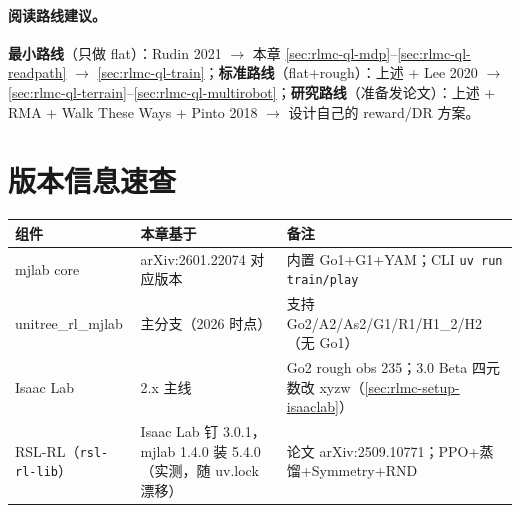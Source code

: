 \paragraph{阅读路线建议。}\textbf{最小路线}（只做 flat）：Rudin 2021 $\to$ 本章 \cref{sec:rlmc-ql-mdp}--\cref{sec:rlmc-ql-readpath} $\to$ \cref{sec:rlmc-ql-train}；\textbf{标准路线}（flat+rough）：上述 + Lee 2020 $\to$ \cref{sec:rlmc-ql-terrain}--\cref{sec:rlmc-ql-multirobot}；\textbf{研究路线}（准备发论文）：上述 + RMA + Walk These Ways + Pinto 2018 $\to$ 设计自己的 reward/DR 方案。

\section{版本信息速查}
\label{sec:rlmc-ql-versions}

\begin{center}
\small
\begin{tabular}{@{}lll@{}}
\toprule
组件 & 本章基于 & 备注 \\
\midrule
mjlab core & arXiv:2601.22074 对应版本 & 内置 Go1+G1+YAM；CLI \verb|uv run train/play| \\
unitree\_rl\_mjlab & 主分支（2026 时点） & 支持 Go2/A2/As2/G1/R1/H1\_2/H2（无 Go1） \\
Isaac Lab & 2.x 主线 & Go2 rough obs 235；3.0 Beta 四元数改 xyzw（\cref{sec:rlmc-setup-isaaclab}） \\
RSL-RL（\texttt{rsl-rl-lib}） & Isaac Lab 钉 3.0.1，mjlab 1.4.0 装 5.4.0（实测，随 uv.lock 漂移） & 论文 arXiv:2509.10771；PPO+蒸馏+Symmetry+RND \\
\bottomrule
\end{tabular}
\end{center}

